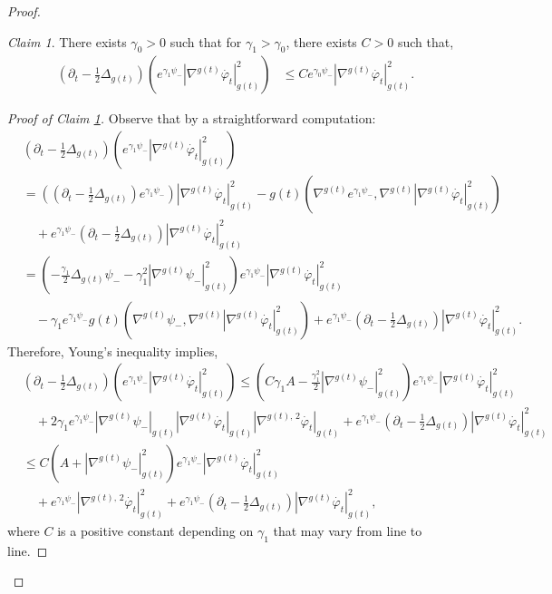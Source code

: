 \documentclass[a4paper,11pt,leqno,english]{smfart}
\theoremstyle{plain}
\theoremstyle{plain}
\numberwithin{equation}{section} %
\numberwithin{figure}{section} %
\theoremstyle{plain}
\theoremstyle{plain}
\theoremstyle{remark}
\newtheorem{claim}[thm]{Claim} %
\theoremstyle{remark}
\theoremstyle{definition}
\theoremstyle{plain}
\theoremstyle{plain}
\theoremstyle{definition}
\newcommand{\f}{\varphi}
\begin{document}
\begin{proof}
\begin{claim}\label{claim-bochner}
There exists $\gamma_0>0$ such that for $\gamma_1>\gamma_0$, there exists $C>0$ such that,
\begin{equation}
\begin{split}\label{est-I-grad}
\left(\partial_t-\frac{1}{2}\Delta_{g(t)}\right)\left(e^{\gamma_1\psi_{-}}|\nabla^{g(t)}\dot{\f_t}|_{g(t)}^2\right)&\leq Ce^{\gamma_0\psi_{-}}|\nabla^{g(t)}\dot{\f_t}|_{g(t)}^2.
\end{split}
\end{equation}
\end{claim}

\begin{proof}[Proof of Claim \ref{claim-bochner}]
Observe that by a straightforward computation:
{\small
\begin{equation*}
\begin{split}
&\left(\partial_t-\frac{1}{2}\Delta_{g(t)}\right)\left(e^{\gamma_1\psi_{-}}|\nabla^{g(t)}\dot{\f_t}|_{g(t)}^2\right)\\
&=\left(\left(\partial_t-\frac{1}{2}\Delta_{g(t)}\right)e^{\gamma_1\psi_{-}}\right)|\nabla^{g(t)}\dot{\f_t}|_{g(t)}^2-g(t)\left(\nabla^{g(t)}e^{\gamma_1\psi_{-}},\nabla^{g(t)}|\nabla^{g(t)}\dot{\f_t}|_{g(t)}^2\right)\\
&\quad+e^{\gamma_1\psi_{-}}\left(\partial_t-\frac{1}{2}\Delta_{g(t)}\right) |\nabla^{g(t)}\dot{\f_t}|_{g(t)}^2\\
&=\left(-\frac{\gamma_1}{2}\Delta_{g(t)}\psi_{-}-\gamma_1^2|\nabla^{g(t)}\psi_{-}|^2_{g(t)}\right)e^{\gamma_1\psi_{-}}|\nabla^{g(t)}\dot{\f_t}|_{g(t)}^2\\
&\quad-\gamma_1e^{\gamma_1\psi_{-}}g(t)\left(\nabla^{g(t)}\psi_{-},\nabla^{g(t)}|\nabla^{g(t)}\dot{\f_t}|_{g(t)}^2\right)+e^{\gamma_1\psi_{-}}\left(\partial_t-\frac{1}{2}\Delta_{g(t)}\right) |\nabla^{g(t)}\dot{\f_t}|_{g(t)}^2.
\end{split}
\end{equation*}
}
Therefore, Young's inequality implies,
{\small
\begin{equation}
\begin{split}\label{lovely-formula}
&\left(\partial_t-\frac{1}{2}\Delta_{g(t)}\right)\left(e^{\gamma_1\psi_{-}}|\nabla^{g(t)}\dot{\f_t}|_{g(t)}^2\right)\leq\left(C\gamma_1 A-\frac{\gamma_1^2}{2}|\nabla^{g(t)}\psi_{-}|^2_{g(t)}\right)e^{\gamma_1\psi_{-}}|\nabla^{g(t)}\dot{\f_t}|_{g(t)}^2\\
&\quad+2\gamma_1e^{\gamma_1\psi_{-}}|\nabla^{g(t)}\psi_{-}|_{g(t)}|\nabla^{g(t)}\dot{\f_t}|_{g(t)}|\nabla^{g(t),\,2}\dot{\f_t}|_{g(t)}+e^{\gamma_1\psi_{-}}\left(\partial_t-\frac{1}{2}\Delta_{g(t)}\right) |\nabla^{g(t)}\dot{\f_t}|_{g(t)}^2\\
&\leq C\left(A+|\nabla^{g(t)}\psi_{-}|^2_{g(t)}\right)e^{\gamma_1\psi_{-}}|\nabla^{g(t)}\dot{\f_t}|_{g(t)}^2\\
&\quad +e^{\gamma_1\psi_{-}}|\nabla^{g(t),\,2}\dot{\f_t}|^2_{g(t)}+e^{\gamma_1\psi_{-}}\left(\partial_t-\frac{1}{2}\Delta_{g(t)}\right) |\nabla^{g(t)}\dot{\f_t}|_{g(t)}^2,
\end{split}
\end{equation}
}
where $C$ is a positive constant depending on $\gamma_1$ that may vary from line to line.


\end{proof}
\end{proof}
\end{document}
